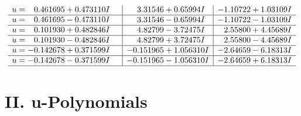 \documentclass[1p]{elsarticle_modified}
\theoremstyle{definition}
\begin{document}
$$\begin{array}{c|c|c}
\begin{aligned}
u &= \phantom{-}0.461695 + 0.473110 I\end{aligned}
 & \phantom{-}3.31546 + 0.65994 I & -1.10722 + 1.03109 I \\ \hline\begin{aligned}
u &= \phantom{-}0.461695 - 0.473110 I\end{aligned}
 & \phantom{-}3.31546 - 0.65994 I & -1.10722 - 1.03109 I \\ \hline\begin{aligned}
u &= \phantom{-}0.101930 + 0.482846 I\end{aligned}
 & \phantom{-}4.82799 - 3.72475 I & \phantom{-}2.55800 + 4.45689 I \\ \hline\begin{aligned}
u &= \phantom{-}0.101930 - 0.482846 I\end{aligned}
 & \phantom{-}4.82799 + 3.72475 I & \phantom{-}2.55800 - 4.45689 I \\ \hline\begin{aligned}
u &= -0.142678 + 0.371599 I\end{aligned}
 & -0.151965 + 1.056310 I & -2.64659 - 6.18313 I \\ \hline\begin{aligned}
u &= -0.142678 - 0.371599 I\end{aligned}
 & -0.151965 - 1.056310 I & -2.64659 + 6.18313 I\\
 \hline 
 \end{array}$$\newpage
\newpage\renewcommand{\arraystretch}{1}
\centering \section*{ II. u-Polynomials}
\end{document}
